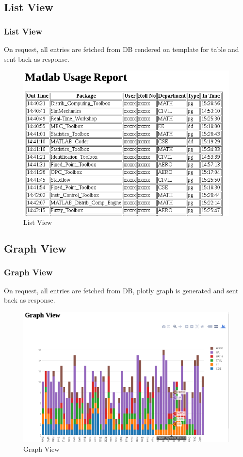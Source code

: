 \documentclass{beamer}
\begin{document}
\subsection{List View}
\begin{frame}
    \frametitle{List View}
    On request, all entries are fetched from DB rendered on template for table and sent back as response.
    \begin{figure}
        \includegraphics[scale=0.45]{listview}
        \caption{List View}
    \end{figure}
\end{frame}

\subsection{Graph View}
\begin{frame}
    \frametitle{Graph View}
    On request, all entries are fetched from DB, plotly graph is generated and sent back as response.
    \begin{figure}
        \includegraphics[scale=0.32]{graphview}
        \caption{Graph View}
    \end{figure}
\end{frame}
\end{document}
